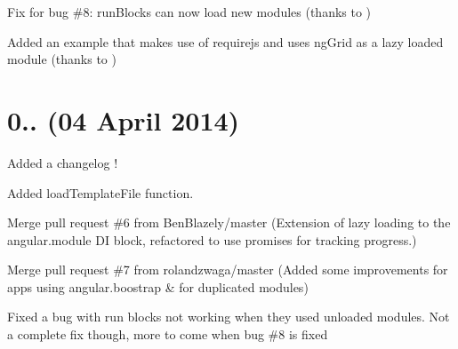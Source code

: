 \begin{DoxyItemize}
\item Fix for bug \#8\+: run\+Blocks can now load new modules (thanks to )
\item Added an example that makes use of requirejs and uses ng\+Grid as a lazy loaded module (thanks to )
\end{DoxyItemize}

\section*{0.. (04 April 2014)}


\begin{DoxyItemize}
\item Added a changelog !
\item Added {\ttfamily load\+Template\+File} function.
\item Merge pull request \#6 from Ben\+Blazely/master (Extension of lazy loading to the angular.\+module DI block, refactored to use promises for tracking progress.)
\item Merge pull request \#7 from rolandzwaga/master (Added some improvements for apps using angular.\+boostrap \& for duplicated modules)
\item Fixed a bug with run blocks not working when they used unloaded modules. Not a complete fix though, more to come when bug \#8 is fixed 
\end{DoxyItemize}